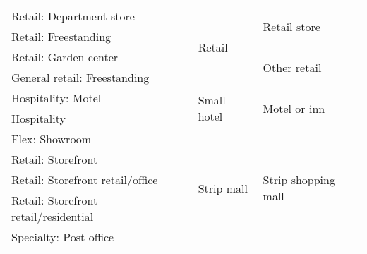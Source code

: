 \begin{table}
\begin{tabular}{|p{4.25cm}|p{3.5cm}|p{3.25cm}|p{4.25cm}|}
Retail: Department store                              &                                                 & \multirow{4}{*}{Retail}                   & \multirow{2}{*}{Retail store}                   \\ \cline{1-1}
Retail: Freestanding                                  &                                                 &                                           &                                                 \\ \cline{1-1} \cline{4-4}
Retail: Garden center                                 &                                                 &                                           & \multirow{2}{*}{Other retail}                   \\ \cline{1-1}
General retail: Freestanding                          &                                                 &                                           &                                                 \\ \cline{1-1} \cline{3-4}
Hospitality: Motel                                    &                                                 & \multirow{2}{*}{Small hotel}              & \multirow{2}{*}{Motel or inn}                   \\ \cline{1-1}
Hospitality                                           &                                                 &                                           &                                                 \\ \cline{1-1} \cline{3-4}
Flex: Showroom                                        &                                                 & \multirow{7}{*}{Strip mall}               & \multirow{7}{*}{Strip shopping mall}            \\ \cline{1-1}
Retail: Storefront                                    &                                                 &                                           &                                                 \\ \cline{1-1}
Retail: Storefront   retail/office                    &                                                 &                                           &                                                 \\ \cline{1-1}
Retail: Storefront   retail/residential               &                                                 &                                           &                                                 \\ \cline{1-1}
Specialty: Post office                                &                                                 &                                           &                                                 \\ \cline{1-1}

\end{tabular}
\end{table}
